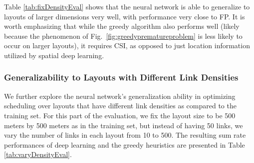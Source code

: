 \documentclass[journal,12pt,onecolumn,draftclsnofoot,]{IEEEtran}
\begin{document}
Table \ref{tab:fixDensityEval} shows that the neural network is able to
generalize to layouts of larger dimensions very well, with performance
very close to FP. It is worth emphasizing that while the greedy algorithm also performs well
(likely because the phenomenon of Fig.~\ref{fig:greedyprematureproblem}
is less likely to occur on larger layouts), it requires CSI, as opposed to just
location information utilized by spatial deep learning.



\subsubsection{Generalizability to Layouts with Different Link Densities}
\label{sec:sumrateVaryDensity}

We further explore the neural network's generalization ability in optimizing
scheduling over layouts that have different link densities as compared to the
training set. For this part of the evaluation, we fix the layout size to be 500
meters by 500 meters as in the training set, but instead of having 50 links, we
vary the number of links in each layout from 10 to 500. The resulting sum rate 
performances of deep learning and the greedy heuristics are presented in Table
\ref{tab:varyDensityEval}.
\end{document}
